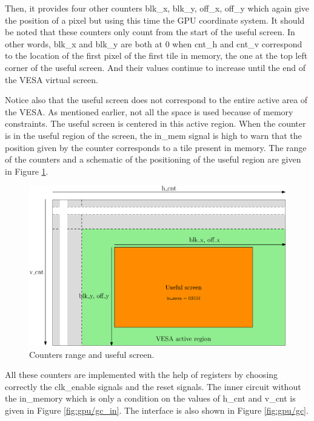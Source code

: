 Then, it provides four other counters blk\_x, blk\_y, off\_x, off\_y which again give the position 
of a pixel but using this time the GPU coordinate system. It should be noted that these counters 
only count from the start of the useful screen. In other words, blk\_x and blk\_y are both at 0 
when cnt\_h and cnt\_v correspond to the location of the first pixel of the first tile in 
memory, the one at the top left corner of the useful screen. And their values continue to increase 
until the end of the VESA virtual screen.

Notice also that the useful screen does not correspond to the entire active area of the 
VESA. As mentioned earlier, not all the space is used because of memory constraints. The useful 
screen is centered in this active region. When the counter is in the useful region of the screen, 
the in\_mem signal is high to warn that the position given by the counter corresponds to a tile 
present in memory. The range of the counters and a schematic of the positioning of the useful 
region are given in Figure \ref{fig:gpu/gc_screen}.

\begin{figure}[H]
    \centering
    \includegraphics[width=\linewidth]{Chapter4-GPU_CLKU/res/gc_screen}
    \caption{Counters range and useful screen.}
    \label{fig:gpu/gc_screen}
\end{figure}

All these counters are implemented with the help of registers by choosing correctly the clk\_enable 
signals and the reset signals. The inner circuit without the in\_memory which is only a condition 
on the values of h\_cnt and v\_cnt is given in Figure \ref{fig:gpu/gc_in}. The interface is also shown in Figure \ref{fig:gpu/gc}.

